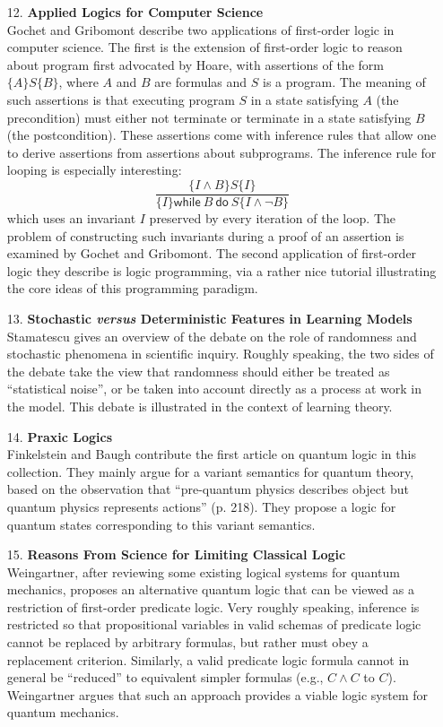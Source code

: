 \documentclass[11pt]{article}
\newcommand{\<}{\langle}
\renewcommand{\>}{\rangle}
\begin{document}
\begin{itemize}
\item[12.] \textbf{Applied Logics for Computer Science}\\
Gochet and Gribomont describe two applications of first-order logic in
computer science.  
The first is the extension of first-order logic to reason about
program first advocated by Hoare, with assertions of the form
$\{A\}S\{B\}$, where $A$ and $B$ are formulas and $S$ is a
program. 
The meaning of such assertions is that executing program $S$ in a
state satisfying $A$ (the precondition) must either not terminate or
terminate in a state satisfying $B$ (the postcondition). 
These assertions come with inference rules that allow one to derive
assertions from assertions about subprograms. 
The inference rule for looping is especially interesting:
\[ \frac{\{I\land
B\}S\{I\}}{\{I\}\mathsf{while}~B~\mathsf{do}~S\{I\land\neg B\}}\]
which uses an invariant $I$ preserved by every iteration of the loop.
The problem of constructing such invariants during a proof of an
assertion is examined by Gochet and Gribomont.
The second application of first-order logic they describe is logic
programming, via a rather nice tutorial illustrating the core ideas of
this programming paradigm.

\item[13.] \textbf{Stochastic \emph{versus} Deterministic Features in
Learning Models}\\
Stamatescu gives an overview of the debate on the role of randomness
and stochastic phenomena in scientific inquiry.
Roughly speaking, the two sides of the debate take the view
that randomness should either be treated as  ``statistical noise'', or
be taken into account directly as a process at work in the model. 
This debate is illustrated in the context of learning theory.

\item[14.] \textbf{Praxic Logics}\\
Finkelstein and Baugh contribute the first article on quantum logic in
this collection. 
They mainly argue for a variant semantics for quantum theory, based on
the observation that ``pre-quantum physics describes object but
quantum physics represents actions'' (p. 218). They propose a logic
for quantum states corresponding to this variant semantics. 

\item[15.] \textbf{Reasons From Science for Limiting Classical
Logic}\\
Weingartner, after reviewing some existing logical systems for
quantum mechanics, proposes an alternative quantum logic that can be
viewed as a restriction of first-order predicate logic. 
Very roughly speaking, inference is restricted so that propositional
variables in valid schemas of predicate logic cannot be replaced by
arbitrary formulas, but rather must obey a replacement criterion. 
Similarly, a valid predicate logic formula cannot in general be
``reduced'' to equivalent simpler formulas (e.g., $C\land C$ to $C$). 
Weingartner argues that such an approach provides a viable logic
system for quantum mechanics.


\end{itemize}
\end{document}
